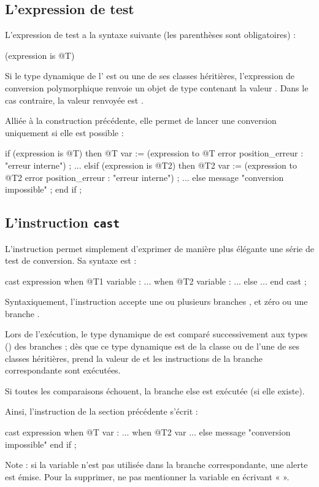 \subsection{L'expression de test}

L'expression de test a la syntaxe suivante (les parenthèses sont obligatoires) :

\begin{galgascode}
(expression is @T)
\end{galgascode}

Si le type dynamique de l'  est  ou une de ses classes héritières, l'expression de conversion polymorphique renvoie un objet de type  contenant la valeur . Dans le cas contraire, la valeur renvoyée est .

Alliée à la construction précédente, elle permet de lancer une conversion uniquement si elle est possible :

\begin{galgascode}
if (expression is @T) then
  @T var := (expression to @T error position_erreur : "erreur interne") ;
  ...
elsif (expression is @T2) then
  @T2 var := (expression to @T2 error position_erreur : "erreur interne") ;
  ...
else
  message "conversion impossible" ;
end if ;
\end{galgascode}

\subsection{L'instruction \texttt{cast}}

L'instruction  permet simplement d'exprimer de manière plus élégante une série de test de conversion. Sa syntaxe est :

\begin{galgascode}
cast expression
when @T1 variable :
  ...
when @T2 variable :
  ...
else
  ...
end cast ;
\end{galgascode}

Syntaxiquement, l'instruction accepte une ou plusieurs branches , et zéro ou une branche .

Lors de l'exécution, le type dynamique de  est comparé successivement aux types () des branches  ; dès que ce type dynamique est de la classe  ou de l'une de ses classes héritières,  prend la valeur de  et les instructions de la branche correspondante sont exécutées.

Si toutes les comparaisons échouent, la branche {else} est exécutée (si elle existe).


Ainsi, l'instruction  de la section précédente s'écrit :


\begin{galgascode}
cast expression
when @T var :
  ...
when @T2 var
  ...
else
  message "conversion impossible"
end if ;
\end{galgascode}

Note : si la variable  n'est pas utilisée dans la branche correspondante, une alerte est émise. Pour la supprimer, ne pas mentionner la variable en écrivant «  ».



